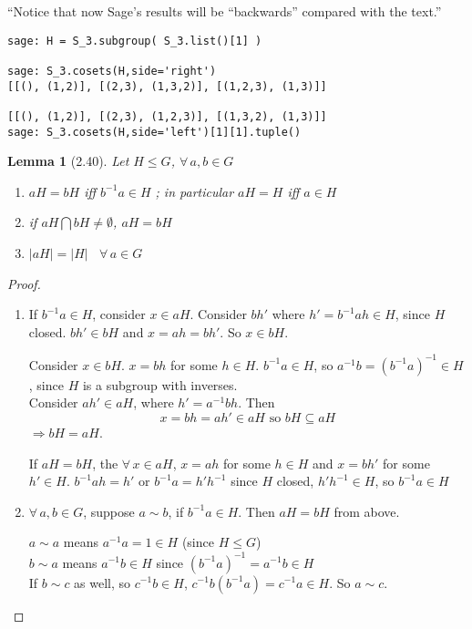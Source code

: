 \documentclass[twoside,landscape]{amsart}
\theoremstyle{plain}
\newtheorem{lemma}{Lemma}
\theoremstyle{definition}
\theoremstyle{remark}
\begin{document}
\begin{multicols*}{2}
\begin{enumerate}
``Notice that now Sage’s results will be “backwards” compared with the text.'' \cite{TJudsonRBeezer2015}

\begin{lstlisting}
sage: H = S_3.subgroup( S_3.list()[1] )

sage: S_3.cosets(H,side='right')
[[(), (1,2)], [(2,3), (1,3,2)], [(1,2,3), (1,3)]]

[[(), (1,2)], [(2,3), (1,2,3)], [(1,3,2), (1,3)]]
sage: S_3.cosets(H,side='left')[1][1].tuple()
\end{lstlisting}

\end{enumerate}


\begin{lemma}[2.40] \label{Lemma:2.40} Let $H \leq G$, $\forall \, a ,b \in G$ 
\begin{enumerate}
  \item[(i)] $aH = bH$ iff $b^{-1}a \in H$ ; in particular $aH = H$ iff $a\in H$ 
\item[(ii)]  if $aH \bigcap bH \neq \emptyset $, $aH = bH$
\item[(iii)] $|aH| = |H|$ \, $\forall \, a \in G$
\end{enumerate}
\end{lemma}

\begin{proof}
\begin{enumerate}
  \item[(i)] If $b^{-1}a \in H$, consider $x\in aH$.  Consider $bh'$ where $h' = b^{-1}ah \in H$, since $H$ closed.  $bh' \in bH$ and $x = ah = bh'$.  So $x \in bH$.  

Consider $x \in bH$.  $x=bh$ for some $h \in H$.  $b^{-1} a \in H$, so $a^{-1}b = (b^{-1}a)^{-1} \in H$, since $H$ is a subgroup with inverses.  \\
Consider $ah' \in aH$, where $h' = a^{-1}bh$.  Then 
\[
x = bh = ah' \in aH \text{ so } bH \subseteq aH
\]
$\Longrightarrow bH = aH$.  

If $aH = bH$, the $\forall \, x \in aH$, $x=ah$ for some $h\in H$ and $x=bh'$ for some $h' \in H$.  $b^{-1}ah = h'$ or $b^{-1}a = h' h^{-1}$ since $H$ closed, $h'h^{-1} \in H$, so $b^{-1}a \in H$
\item[(ii)] $\forall \, a ,b \in G$, suppose $a\sim b$, if $b^{-1}a \in H$.  Then $aH = bH$ from above.  

$a\sim a$ means $a^{-1}a = 1 \in H$ (since $H\leq G$) \\
  $b\sim a$ means $a^{-1}b \in H$ since $(b^{-1}a)^{-1} = a^{-1}b \in H$ \\
If $b\sim c$ as well, so $c^{-1}b \in H$, $c^{-1}b(b^{-1}a) = c^{-1}a \in H$.  So $a\sim c$.  


\end{enumerate}
\end{proof}
\end{multicols*}
\end{document}
